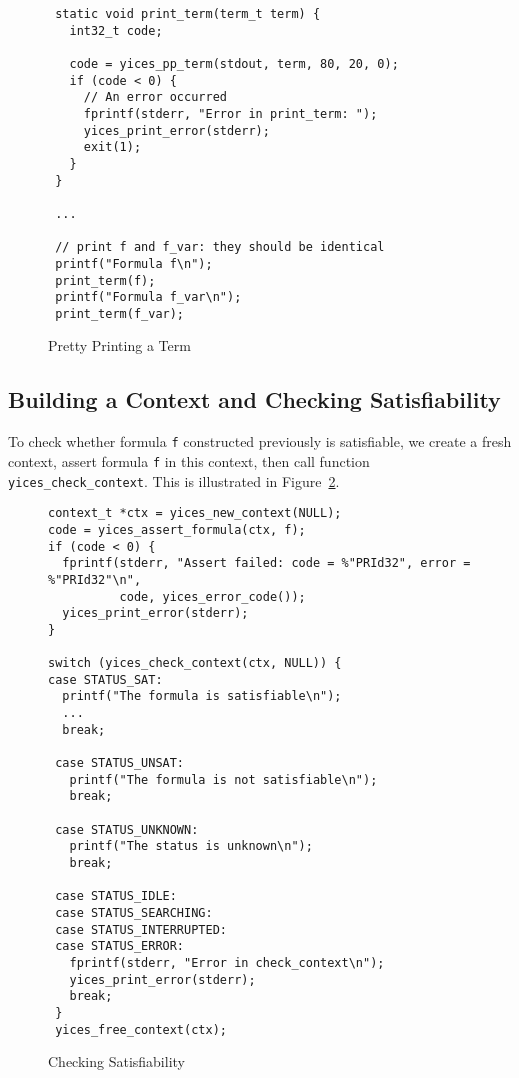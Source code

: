\documentclass[11pt,twoside,fleqn,openright,titlepage]{cslreport}
\begin{document}
\begin{figure}
\begin{footnotesize}
\begin{verbatim}
 static void print_term(term_t term) {
   int32_t code;

   code = yices_pp_term(stdout, term, 80, 20, 0);
   if (code < 0) {
     // An error occurred
     fprintf(stderr, "Error in print_term: ");
     yices_print_error(stderr);
     exit(1);
   }
 }

 ...

 // print f and f_var: they should be identical
 printf("Formula f\n");
 print_term(f);
 printf("Formula f_var\n");
 print_term(f_var);
\end{verbatim}
\end{footnotesize}
\caption{Pretty Printing a Term}
\label{pretty-printing}
\end{figure}

\subsection*{Building a Context and Checking Satisfiability}

To check whether formula \texttt{f} constructed previously is
satisfiable, we create a fresh context, assert formula \texttt{f}
in this context, then call function
\texttt{yices\_check\_context}. This is illustrated in
Figure~\ref{context-check}.

\begin{figure}
\begin{footnotesize}
\begin{verbatim}
context_t *ctx = yices_new_context(NULL);
code = yices_assert_formula(ctx, f);
if (code < 0) {
  fprintf(stderr, "Assert failed: code = %"PRId32", error = %"PRId32"\n",
          code, yices_error_code());
  yices_print_error(stderr);
}

switch (yices_check_context(ctx, NULL)) {
case STATUS_SAT:
  printf("The formula is satisfiable\n");
  ...
  break;

 case STATUS_UNSAT:
   printf("The formula is not satisfiable\n");
   break;

 case STATUS_UNKNOWN:
   printf("The status is unknown\n");
   break;

 case STATUS_IDLE:
 case STATUS_SEARCHING:
 case STATUS_INTERRUPTED:
 case STATUS_ERROR:
   fprintf(stderr, "Error in check_context\n");
   yices_print_error(stderr);
   break;
 }
 yices_free_context(ctx);
\end{verbatim}
\end{footnotesize}
\caption{Checking Satisfiability}
\label{context-check}
\end{figure}
\end{document}
